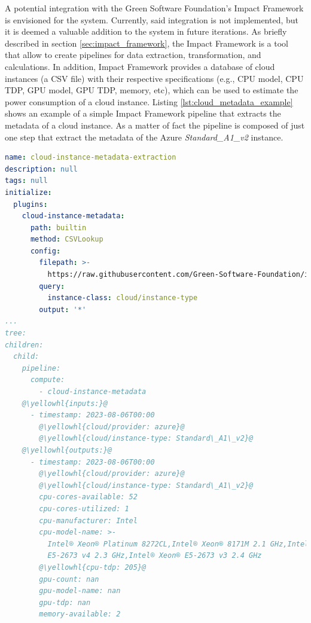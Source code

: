 A potential integration with the Green Software Foundation's Impact Framework is envisioned for the system.
Currently, said integration is not implemented, but it is deemed a valuable addition to the system in future iterations.
As briefly described in section \ref{sec:impact_framework}, the Impact Framework is a tool that allow to create pipelines for data extraction, transformation, and calculations.
In addition, Impact Framework provides a database of cloud instances (a CSV file) with their respective specifications (e.g., CPU model, CPU TDP, GPU model, GPU TDP, memory, etc), which can be used to estimate the power consumption of a cloud instance.
Listing \ref{lst:cloud_metadata_example} shows an example of a simple Impact Framework pipeline that extracts the metadata of a cloud instance.
As a matter of fact the pipeline is composed of just one step that extract the metadata of the Azure \textit{Standard\_A1\_v2} instance. \newline

\begin{lstlisting}[language=yaml, caption={Cloud Metadata extraction example}, label={lst:cloud_metadata_example}]
name: cloud-instance-metadata-extraction
description: null
tags: null
initialize:
  plugins:
    cloud-instance-metadata:
      path: builtin
      method: CSVLookup
      config:
        filepath: >-
          https://raw.githubusercontent.com/Green-Software-Foundation/if-data/main/cloud-metdata-azure-instances.csv
        query:
          instance-class: cloud/instance-type
        output: '*'
...
tree:
children:
  child:
    pipeline:
      compute:
        - cloud-instance-metadata
    @\yellowhl{inputs:}@
      - timestamp: 2023-08-06T00:00
        @\yellowhl{cloud/provider: azure}@
        @\yellowhl{cloud/instance-type: Standard\_A1\_v2}@
    @\yellowhl{outputs:}@
      - timestamp: 2023-08-06T00:00
        @\yellowhl{cloud/provider: azure}@
        @\yellowhl{cloud/instance-type: Standard\_A1\_v2}@
        cpu-cores-available: 52
        cpu-cores-utilized: 1
        cpu-manufacturer: Intel
        cpu-model-name: >-
          Intel® Xeon® Platinum 8272CL,Intel® Xeon® 8171M 2.1 GHz,Intel® Xeon®
          E5-2673 v4 2.3 GHz,Intel® Xeon® E5-2673 v3 2.4 GHz
        @\yellowhl{cpu-tdp: 205}@
        gpu-count: nan
        gpu-model-name: nan
        gpu-tdp: nan
        memory-available: 2
\end{lstlisting}

